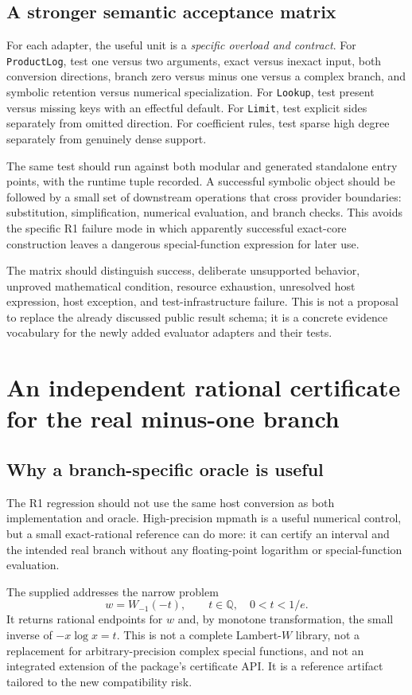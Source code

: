 \documentclass[11pt,a4paper]{article}
\newcommand{\code}[1]{\texttt{#1}}
\begin{document}
\subsection{A stronger semantic acceptance matrix}
For each adapter, the useful unit is a \emph{specific overload and contract}. For \code{ProductLog}, test one versus two arguments, exact versus inexact input, both conversion directions, branch zero versus minus one versus a complex branch, and symbolic retention versus numerical specialization. For \code{Lookup}, test present versus missing keys with an effectful default. For \code{Limit}, test explicit sides separately from omitted direction. For coefficient rules, test sparse high degree separately from genuinely dense support.

The same test should run against both modular and generated standalone entry points, with the runtime tuple recorded. A successful symbolic object should be followed by a small set of downstream operations that cross provider boundaries: substitution, simplification, numerical evaluation, and branch checks. This avoids the specific R1 failure mode in which apparently successful exact-core construction leaves a dangerous special-function expression for later use.

The matrix should distinguish success, deliberate unsupported behavior, unproved mathematical condition, resource exhaustion, unresolved host expression, host exception, and test-infrastructure failure. This is not a proposal to replace the already discussed public result schema; it is a concrete evidence vocabulary for the newly added evaluator adapters and their tests.

\section{An independent rational certificate for the real minus-one branch}
\label{sec:certificate}
\subsection{Why a branch-specific oracle is useful}
The R1 regression should not use the same host conversion as both implementation and oracle. High-precision mpmath is a useful numerical control, but a small exact-rational reference can do more: it can certify an interval and the intended real branch without any floating-point logarithm or special-function evaluation.

The supplied  addresses the narrow problem
\begin{equation}
 w=W_{-1}(-t),\qquad t\in\mathbb{Q},\quad 0<t<1/e.
\end{equation}
It returns rational endpoints for $w$ and, by monotone transformation, the small inverse of $-x\log x=t$. This is not a complete Lambert-$W$ library, not a replacement for arbitrary-precision complex special functions, and not an integrated extension of the package's certificate API. It is a reference artifact tailored to the new compatibility risk.
\end{document}
